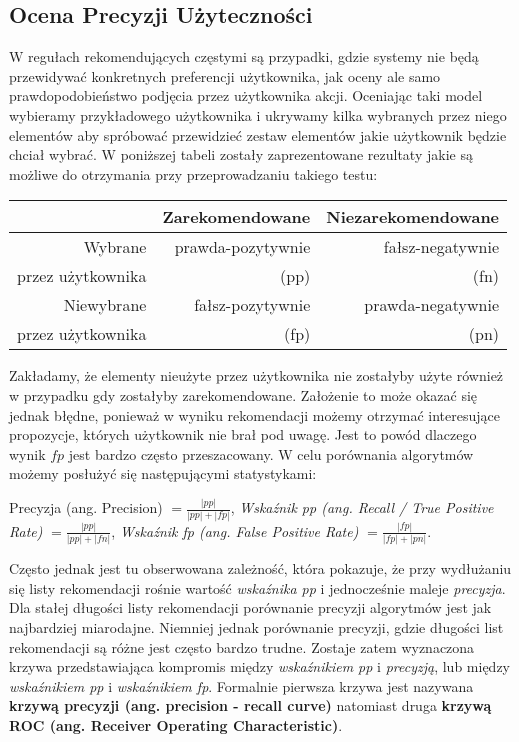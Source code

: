 \documentclass[12pt,a4paper]{report}
\begin{document}
\subsection{Ocena Precyzji Użyteczności}
W regułach rekomendujących częstymi są przypadki, gdzie systemy nie będą przewidywać konkretnych preferencji użytkownika, jak oceny ale samo prawdopodobieństwo podjęcia przez użytkownika akcji.
Oceniając taki model wybieramy przykładowego użytkownika i ukrywamy kilka wybranych przez niego elementów aby spróbować przewidzieć zestaw elementów jakie użytkownik będzie chciał wybrać. W poniższej tabeli zostały zaprezentowane rezultaty jakie są możliwe do otrzymania przy przeprowadzaniu takiego testu:
\begin{center}
\begin{tabular}{|r|r|r|} \hline
 & Zarekomendowane & Niezarekomendowane  \\
\hline 
Wybrane & prawda-pozytywnie & fałsz-negatywnie \\
przez użytkownika &(pp)&(fn) \\
\hline
Niewybrane & fałsz-pozytywnie & prawda-negatywnie  \\
przez użytkownika &(fp)&(pn) \\
\hline
\end{tabular}
\end{center}
Zakładamy, że elementy nieużyte przez użytkownika nie zostałyby użyte również w przypadku gdy zostałyby zarekomendowane. Założenie to może okazać się jednak błędne, ponieważ w wyniku rekomendacji możemy otrzymać interesujące propozycje, których użytkownik nie brał pod uwagę. Jest to powód dlaczego wynik $fp$ jest bardzo często przeszacowany.
W celu porównania algorytmów możemy posłużyć się następującymi statystykami:
\begin{center}
Precyzja (ang. Precision) $= \frac{|pp|}{|pp|+|fp|}$, %
\textit{Wskaźnik pp (ang. Recall / True Positive Rate)} $ = \frac{|pp|}{|pp|+|fn|}$,
\textit{Wskaźnik fp (ang. False Positive Rate)} $ = \frac{|fp|}{|fp|+|pn|}$.
\end{center}
Często jednak jest tu obserwowana zależność, która pokazuje, że przy wydłużaniu się listy rekomendacji rośnie wartość \textit{wskaźnika pp} i jednocześnie maleje \textit{precyzja}. Dla stałej długości listy rekomendacji porównanie precyzji algorytmów jest jak najbardziej miarodajne. Niemniej jednak porównanie precyzji, gdzie długości list rekomendacji są różne jest często bardzo trudne. Zostaje zatem wyznaczona krzywa przedstawiająca kompromis między \textit{wskaźnikiem pp} i \textit{precyzją}, lub między \textit{wskaźnikiem pp} i \textit{wskaźnikiem fp}. Formalnie pierwsza krzywa jest nazywana \textbf{krzywą precyzji (ang. precision - recall curve)} natomiast druga \textbf{krzywą ROC (ang. Receiver Operating Characteristic)}.
\end{document}
